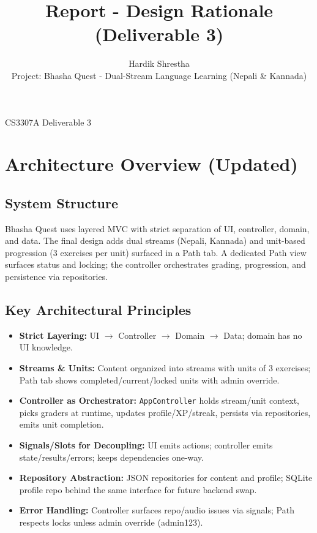 \documentclass{article}
\date{}
\title{Report - Design Rationale (Deliverable 3)}
\author{Hardik Shrestha \\ Project: Bhasha Quest - Dual-Stream Language Learning (Nepali \& Kannada)}
\begin{document}
\maketitle
\begin{center}
\small CS3307A Deliverable 3
\end{center}
\vspace{0.5em}
\tableofcontents
\newpage

\section{Architecture Overview (Updated)}
\subsection{System Structure}
Bhasha Quest uses layered MVC with strict separation of UI, controller, domain, and data. The final design adds dual streams (Nepali, Kannada) and unit-based progression (3 exercises per unit) surfaced in a Path tab. A dedicated Path view surfaces status and locking; the controller orchestrates grading, progression, and persistence via repositories.

\subsection{Key Architectural Principles}
\begin{itemize}
  \item \textbf{Strict Layering:} UI $\rightarrow$ Controller $\rightarrow$ Domain $\rightarrow$ Data; domain has no UI knowledge.
  \item \textbf{Streams \& Units:} Content organized into streams with units of 3 exercises; Path tab shows completed/current/locked units with admin override.
  \item \textbf{Controller as Orchestrator:} \texttt{AppController} holds stream/unit context, picks graders at runtime, updates profile/XP/streak, persists via repositories, emits unit completion.
  \item \textbf{Signals/Slots for Decoupling:} UI emits actions; controller emits state/results/errors; keeps dependencies one-way.
  \item \textbf{Repository Abstraction:} JSON repositories for content and profile; SQLite profile repo behind the same interface for future backend swap.
  \item \textbf{Error Handling:} Controller surfaces repo/audio issues via signals; Path respects locks unless admin override (admin123).
\end{itemize}
\end{document}
